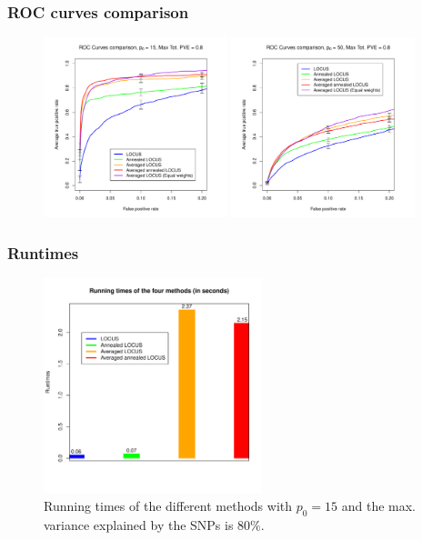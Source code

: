\documentclass{beamer}
\begin{document}
\begin{frame}
\frametitle{ROC curves comparison}
\begin{figure}
\includegraphics[width=2.1in]{images/ROC_curves_w_equal_weight.pdf}
\includegraphics[width=2.1in]{images/ROC_curves_w_equal_weight_50.pdf}
\end{figure}
\end{frame}

\begin{frame}
\frametitle{Runtimes}
\begin{figure}
\includegraphics[width=2.5in]{images/runtimes.pdf}
\caption{Running times of the different methods with $p_0 = 15$ and the max. variance explained by the SNPs is $80\%$.}
\end{figure}
\end{frame}

\end{document}
